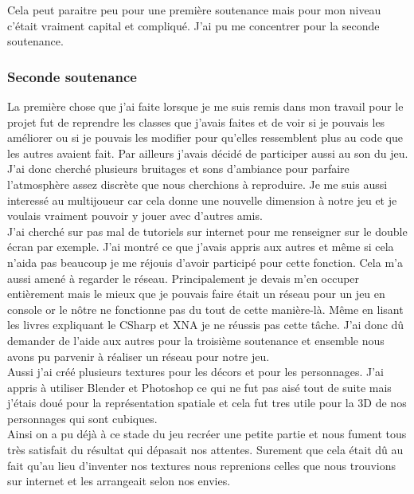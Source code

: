 \documentclass[12pt]{article}
\begin{document}
Cela peut paraitre peu pour une première soutenance mais pour mon niveau c’était vraiment capital et compliqué. J’ai pu me concentrer pour la seconde soutenance.\\

\newpage
\subsubsection{Seconde soutenance}

La première chose que j’ai faite lorsque je me suis remis dans mon travail pour le projet fut de reprendre les classes que j’avais faites et de voir si je pouvais les améliorer ou si je pouvais les modifier pour qu’elles ressemblent plus au code que les autres avaient fait. Par ailleurs j’avais décidé de participer aussi au son du jeu. J’ai donc cherché plusieurs bruitages et sons d’ambiance pour parfaire l’atmosphère assez discrète que nous cherchions à reproduire. Je me suis aussi interessé au multijoueur car cela donne une nouvelle dimension à notre jeu et je voulais vraiment pouvoir y jouer avec d'autres amis.\\

J’ai cherché sur pas mal de tutoriels sur internet pour me renseigner sur le double écran par exemple. J’ai montré ce que j’avais appris aux autres et même si cela n’aida pas beaucoup je me réjouis d’avoir participé pour cette fonction. Cela m’a aussi amené à regarder le réseau. Principalement je devais m’en occuper entièrement mais le mieux que je pouvais faire était un réseau pour un jeu en console or le nôtre ne fonctionne pas du tout de cette manière-là. Même en lisant les livres expliquant le CSharp et XNA je ne réussis pas cette tâche. J’ai donc dû demander de l’aide aux autres pour la troisième soutenance et ensemble nous avons pu  parvenir à réaliser un réseau pour notre jeu.\\

Aussi j'ai créé plusieurs textures pour les décors et pour les personnages. J'ai appris à utiliser Blender et Photoshop ce qui ne fut pas aisé tout de suite mais j'étais doué pour la représentation spatiale et cela fut tres utile pour la 3D de nos personnages qui sont cubiques.\\

Ainsi on a pu déjà à ce stade du jeu recréer une petite partie et nous fument tous très satisfait du résultat qui dépasait nos attentes. Surement que cela était dû au fait qu'au lieu d'inventer nos textures nous reprenions celles que nous trouvions sur internet et les arrangeait selon nos envies.\\
\end{document}
